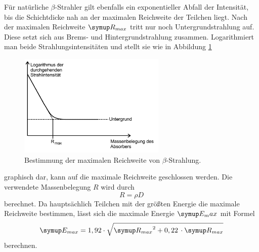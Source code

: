 Für natürliche $\beta$-Strahler gilt ebenfalls ein exponentieller Abfall der
Intensität, bis die Schichtdicke nah an der maximalen Reichweite der Teilchen liegt.
Nach der maximalen Reichweite $\su{R_{max}}$ tritt nur noch Untergrundstrahlung auf.
Diese setzt sich aus Brems- und Hintergrundstrahlung zusammen. Logarithmiert man
beide Strahlungsintensitäten und stellt sie wie in Abbildung \ref{fig:reich}
\newpage
\begin{figure}
  \includegraphics[width=7cm]{bilder/betaabsorp.jpg}
  \caption{Bestimmung der maximalen Reichweite von $\beta$-Strahlung.\cite{704}}
  \label{fig:reich}
\end{figure}
graphisch dar, kann auf die maximale Reichweite geschlossen werden. Die verwendete
Massenbelegung $R$ wird durch
\begin{equation}
  R=\rho D
\end{equation}
berechnet. Da hauptsächlich Teilchen mit der größten Energie die maximale Reichweite
bestimmen, lässt sich die maximale Energie $\su{E_max}$ mit Formel
\begin{equation}
  \su{E_{max}} = 1,92 \cdot\sqrt{\su{R_{max}}^2+0,22\,\cdot\su{R_{max}}}
  \label{eqn:emax}
\end{equation}
berechnen.
